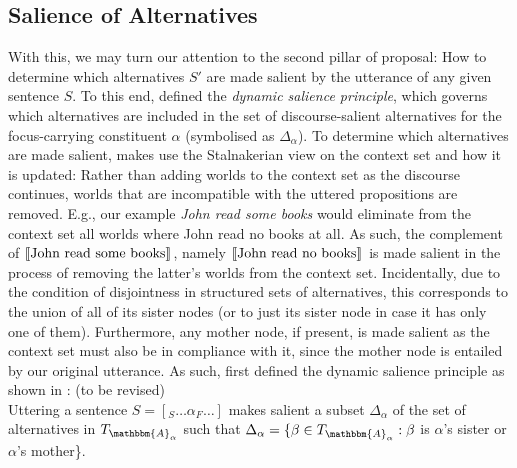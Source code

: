 \subsection{Salience of Alternatives}
With this, we may turn our attention to the second pillar of  proposal: How to determine which alternatives $S'$ are made salient by the utterance of any given sentence $S$. To this end, \textcite[p. 642]{Ippolito2020} defined the \textit{dynamic salience principle}, which governs which alternatives are included in the set of discourse-salient alternatives for the focus-carrying constituent $\alpha$ (symbolised as $\Delta_\alpha$). To determine which alternatives are made salient, \textcite{Ippolito2020} makes use the Stalnakerian view on the context set and how it is updated: Rather than adding worlds to the context set as the discourse continues, worlds that are incompatible with the uttered propositions are removed. E.g., our example \textit{John read some books} would eliminate from the context set all worlds where John read no books at all. As such, the complement of $\intension[]{John read some books}$, namely $\intension[]{John read no books}$ is made salient in the process of removing the latter's worlds from the context set. Incidentally, due to the condition of disjointness in structured sets of alternatives, this corresponds to the union of all of its sister nodes (or to just its sister node in case it has only one of them). Furthermore, any mother node, if present, is made salient as the context set must also be in compliance with it, since the mother node is entailed by our original utterance. As such, \textcite{Ippolito2020} first defined the dynamic salience principle as shown in :
\ex{} (to be revised)\\
Uttering a sentence $S=[_S\ldots\alpha_F\ldots]$ makes salient a subset $\Delta_\alpha$ of the set of alternatives in $T_{\mathbbm{A}_\alpha}$ such that $\Delta_\alpha=\{\beta\in T_{\mathbbm{A}_\alpha}: \beta$ is $\alpha$’s sister or $\alpha$’s mother\}.\\\emptyfill\parencite[p. 641]{Ippolito2020}
\xe

